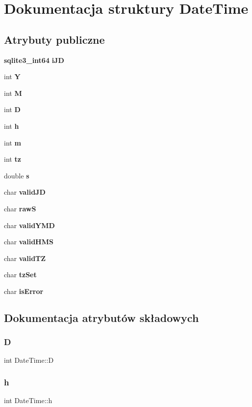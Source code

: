 \section{Dokumentacja struktury Date\+Time}
\label{struct_date_time}
\subsection*{Atrybuty publiczne}
\begin{DoxyCompactItemize}
\item 
\textbf{ sqlite3\+\_\+int64} \textbf{ i\+JD}
\item 
int \textbf{ Y}
\item 
int \textbf{ M}
\item 
int \textbf{ D}
\item 
int \textbf{ h}
\item 
int \textbf{ m}
\item 
int \textbf{ tz}
\item 
double \textbf{ s}
\item 
char \textbf{ valid\+JD}
\item 
char \textbf{ rawS}
\item 
char \textbf{ valid\+Y\+MD}
\item 
char \textbf{ valid\+H\+MS}
\item 
char \textbf{ valid\+TZ}
\item 
char \textbf{ tz\+Set}
\item 
char \textbf{ is\+Error}
\end{DoxyCompactItemize}


\subsection{Dokumentacja atrybutów składowych}
\mbox{\label{struct_date_time_a979ec52428a05d2f2ed827345a416fa6}} 
\subsubsection{D}
{\footnotesize\ttfamily int Date\+Time\+::D}

\mbox{\label{struct_date_time_a2146547149b65f64e07e1ac6ed8654b6}} 
\subsubsection{h}
{\footnotesize\ttfamily int Date\+Time\+::h}

